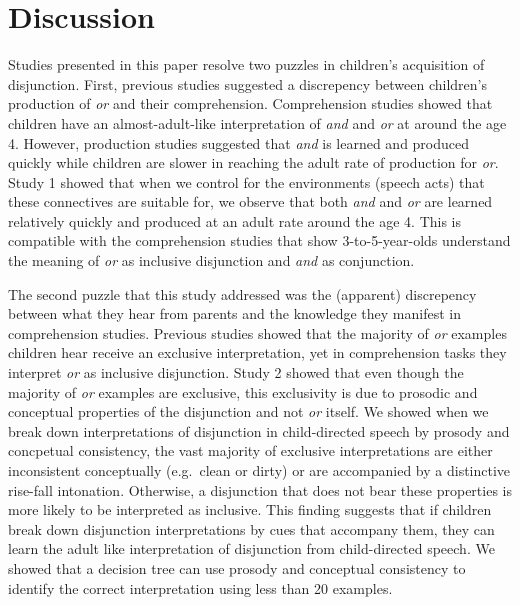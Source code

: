 \documentclass[10pt, letterpaper]{article}
\begin{document}
\section{Discussion}\label{discussion}

Studies presented in this paper resolve two puzzles in children's
acquisition of disjunction. First, previous studies suggested a
discrepency between children's production of \emph{or} and their
comprehension. Comprehension studies showed that children have an
almost-adult-like interpretation of \emph{and} and \emph{or} at around
the age 4. However, production studies suggested that \emph{and} is
learned and produced quickly while children are slower in reaching the
adult rate of production for \emph{or}. Study 1 showed that when we
control for the environments (speech acts) that these connectives are
suitable for, we observe that both \emph{and} and \emph{or} are learned
relatively quickly and produced at an adult rate around the age 4. This
is compatible with the comprehension studies that show 3-to-5-year-olds
understand the meaning of \emph{or} as inclusive disjunction and
\emph{and} as conjunction.

The second puzzle that this study addressed was the (apparent)
discrepency between what they hear from parents and the knowledge they
manifest in comprehension studies. Previous studies showed that the
majority of \emph{or} examples children hear receive an exclusive
interpretation, yet in comprehension tasks they interpret \emph{or} as
inclusive disjunction. Study 2 showed that even though the majority of
\emph{or} examples are exclusive, this exclusivity is due to prosodic
and conceptual properties of the disjunction and not \emph{or} itself.
We showed when we break down interpretations of disjunction in
child-directed speech by prosody and concpetual consistency, the vast
majority of exclusive interpretations are either inconsistent
conceptually (e.g.~clean or dirty) or are accompanied by a distinctive
rise-fall intonation. Otherwise, a disjunction that does not bear these
properties is more likely to be interpreted as inclusive. This finding
suggests that if children break down disjunction interpretations by cues
that accompany them, they can learn the adult like interpretation of
disjunction from child-directed speech. We showed that a decision tree
can use prosody and conceptual consistency to identify the correct
interpretation using less than 20 examples.
\end{document}
